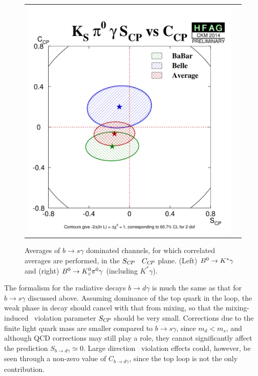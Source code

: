 \begin{figure}[htb]
\begin{center}
\begin{tabular}{cc}
{        \includegraphics{figures/cp_uta/KSpi0gammaS_CPvsC_CP}
      }
    \end{tabular}
  \end{center}
  \vspace{-0.8cm}
  \caption{
    Averages of $b \to s\gamma$ dominated channels,
    for which correlated averages are performed,
    in the $S_{C\!P}$ \vs\ $C_{C\!P}$ plane.
    (Left) $B^0 \to K^*\gamma$ and 
    (right) $B^0 \to K^0_{\scriptscriptstyle S}\pi^0\gamma$ (including $K^*\gamma$).
  }
  \label{fig:cp_uta:bsg_SvsC}
\end{figure}

{}
\label{sec:cp_uta:bdg}

The formalism for the radiative decays $b \to d\gamma$ is much the same
as that for $b \to s\gamma$ discussed above.
Assuming dominance of the top quark in the loop,
the weak phase in decay should cancel with that from mixing,
so that the mixing-induced \CP\ violation parameter $S_{C\!P}$ 
should be very small.
Corrections due to the finite light quark mass are smaller
compared to $b \to s\gamma$, since $m_d < m_s$,
and although QCD corrections may still play a role,
they cannot significantly affect the prediction $S_{b \to d \gamma} \simeq 0$.
Large direction \CP\ violation effects could, however, be seen through
a non-zero value of $C_{b \to d \gamma}$, 
since the top loop is not the only contribution.

